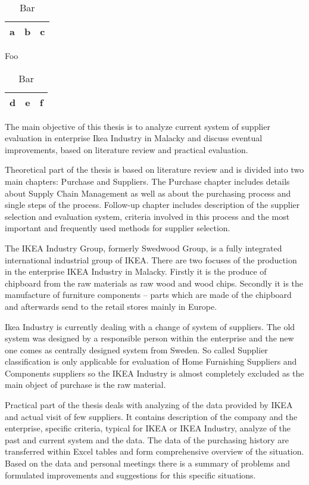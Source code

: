 \documentclass[oneside,12pt]{article}%
\begin{document}
\begin{table}
  \parbox{.45\linewidth}{
  \centering
  \begin{tabular}{ccc}
    \hline
    a&b&c\\
    \hline
  \end{tabular}
  \caption{Foo}
  }
  \hfill
  \parbox{.45\linewidth}{
  \centering
  \begin{tabular}{ccc}
    \hline
    d&e&f\\
    \hline
  \end{tabular}
  \caption{Bar}
  }
\end{table}

The main objective of this thesis is to analyze current system of supplier evaluation in enterprise Ikea Industry in Malacky and discuss eventual improvements, based on literature review and practical evaluation.\par
Theoretical part of the thesis is based on literature review and is divided into two main chapters: Purchase and Suppliers. The Purchase chapter includes details about Supply Chain Management as well as about the purchasing process and single steps of the process. Follow-up chapter includes description of the supplier selection and evaluation system, criteria involved in this process and the most important and frequently used methods for supplier selection.\par
The IKEA Industry Group, formerly Swedwood Group, is a fully integrated international industrial group of IKEA. There are two focuses of the production in the enterprise IKEA Industry in Malacky. Firstly it is the produce of chipboard from the raw materials as raw wood and wood chips. Secondly it is the manufacture of furniture components – parts which are made of the chipboard and afterwards send to the retail stores mainly in Europe.\par
Ikea Industry is currently dealing with a change of system of suppliers. The old system was designed by a responsible person within the enterprise and the new one comes as centrally designed system from Sweden. So called Supplier classification is only applicable for evaluation of Home Furnishing Suppliers and Components suppliers so the IKEA Industry is almost completely excluded as the main object of purchase is the raw material.\par
Practical part of the thesis deals with analyzing of the data provided by IKEA and actual visit of few suppliers. It contains description of the company and the enterprise, specific criteria, typical for IKEA or IKEA Industry, analyze of the past and current system and the data. The data of the purchasing history are transferred within Excel tables and form comprehensive overview of the situation. Based on the data and personal meetings there is a summary of problems and formulated improvements and suggestions for this specific situations.
\end{document}
